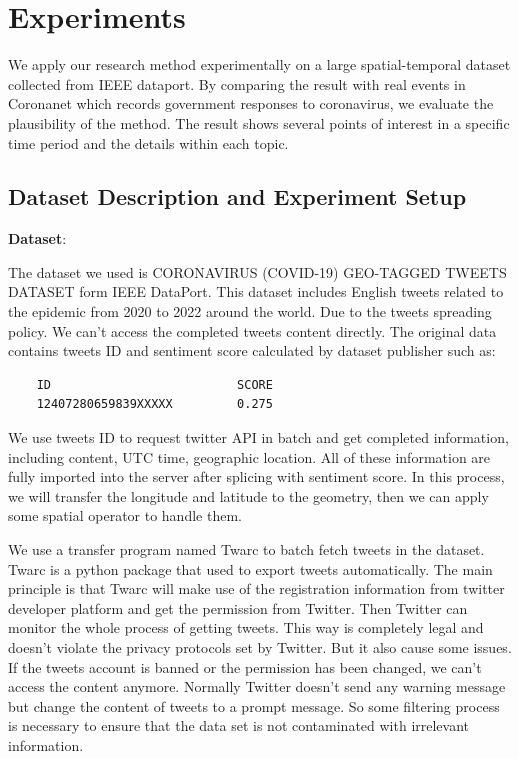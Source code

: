 \section{Experiments}
\label{sec:exp}
We apply our research method experimentally on a large spatial-temporal dataset collected from IEEE dataport. By comparing the result with real events in Coronanet which records government responses to coronavirus, we evaluate the plausibility of the method. The result shows several points of interest in a specific time period and the details within each topic.
\subsection{Dataset Description and Experiment Setup}
{\bf Dataset}: 

The dataset we used is CORONAVIRUS (COVID-19) GEO-TAGGED TWEETS DATASET form IEEE DataPort. This dataset includes English tweets related to the epidemic from 2020 to 2022 around the world. Due to the tweets spreading policy. We can't access the
completed tweets content directly. The original data contains tweets ID and sentiment score calculated by
dataset publisher such as:
\begin{verbatim}
    ID                          SCORE
    12407280659839XXXXX         0.275
\end{verbatim} 

We use tweets ID to
request twitter API in batch and get completed information, including
content, UTC time, geographic location. All of these information are fully
imported into the server after splicing with sentiment score.  In this
process, we will transfer the longitude and latitude to the geometry, then we
can apply some spatial operator to handle them.

We use a transfer program named
Twarc to batch fetch tweets in the dataset. Twarc is a python package
that used to export tweets automatically.  The main principle is that Twarc
will make use of the registration information from twitter developer platform
and get the permission from Twitter. Then Twitter can monitor the whole
process of getting tweets. This way is completely legal and doesn't violate
the privacy protocols set by Twitter. But it also cause some issues. If the
tweets account is banned or the permission has been changed, we can't access
the content anymore. Normally Twitter doesn't send any warning message but
change the content of tweets to a prompt message. So some filtering process
is necessary to ensure that the data set is not contaminated with irrelevant
information. 

